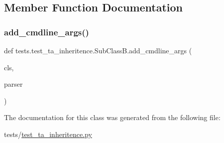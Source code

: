 \subsection{Member Function Documentation}
\mbox{\label{classtests_1_1test__ta__inheritence_1_1SubClassB_a9aa7384116305903fbf530d4710e83a3}} 
\subsubsection{\texorpdfstring{add\+\_\+cmdline\+\_\+args()}{add\_cmdline\_args()}}
{\footnotesize\ttfamily def tests.\+test\+\_\+ta\+\_\+inheritence.\+Sub\+Class\+B.\+add\+\_\+cmdline\+\_\+args (\begin{DoxyParamCaption}\item[{}]{cls,  }\item[{}]{parser }\end{DoxyParamCaption})}



The documentation for this class was generated from the following file\+:\begin{DoxyCompactItemize}
\item 
tests/\hyperlink{test__ta__inheritence_8py}{test\+\_\+ta\+\_\+inheritence.\+py}\end{DoxyCompactItemize}

